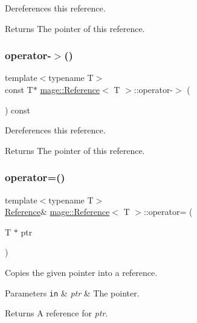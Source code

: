 Dereferences this reference.

\begin{DoxyReturn}{Returns}
The pointer of this reference. 
\end{DoxyReturn}
\hypertarget{classmage_1_1_reference_ab0f3ae3e1c9f71c211db4b1ec6dcca83}{}\label{classmage_1_1_reference_ab0f3ae3e1c9f71c211db4b1ec6dcca83} 
\subsubsection{\texorpdfstring{operator-\/$>$()}{operator->()}\hspace{0.1cm}{\footnotesize\ttfamily [2/2]}}
{\footnotesize\ttfamily template$<$typename T$>$ \\
const T$\ast$ \hyperlink{classmage_1_1_reference}{mage\+::\+Reference}$<$ T $>$\+::operator-\/$>$ (\begin{DoxyParamCaption}{ }\end{DoxyParamCaption}) const}

Dereferences this reference.

\begin{DoxyReturn}{Returns}
The pointer of this reference. 
\end{DoxyReturn}
\hypertarget{classmage_1_1_reference_abf1457f709eefcc56e23ad6f127cd9a4}{}\label{classmage_1_1_reference_abf1457f709eefcc56e23ad6f127cd9a4} 
\subsubsection{\texorpdfstring{operator=()}{operator=()}\hspace{0.1cm}{\footnotesize\ttfamily [1/2]}}
{\footnotesize\ttfamily template$<$typename T$>$ \\
\hyperlink{classmage_1_1_reference}{Reference}\& \hyperlink{classmage_1_1_reference}{mage\+::\+Reference}$<$ T $>$\+::operator= (\begin{DoxyParamCaption}\item[{T $\ast$}]{ptr }\end{DoxyParamCaption})}

Copies the given pointer into a reference.


\begin{DoxyParams}[1]{Parameters}
\mbox{\tt in}  & {\em ptr} & The pointer. \\
\hline
\end{DoxyParams}
\begin{DoxyReturn}{Returns}
A reference for {\itshape ptr}. 
\end{DoxyReturn}
\hypertarget{classmage_1_1_reference_a0e0fadab4a752fb78124380feeafb2a2}{}\label{classmage_1_1_reference_a0e0fadab4a752fb78124380feeafb2a2} 
